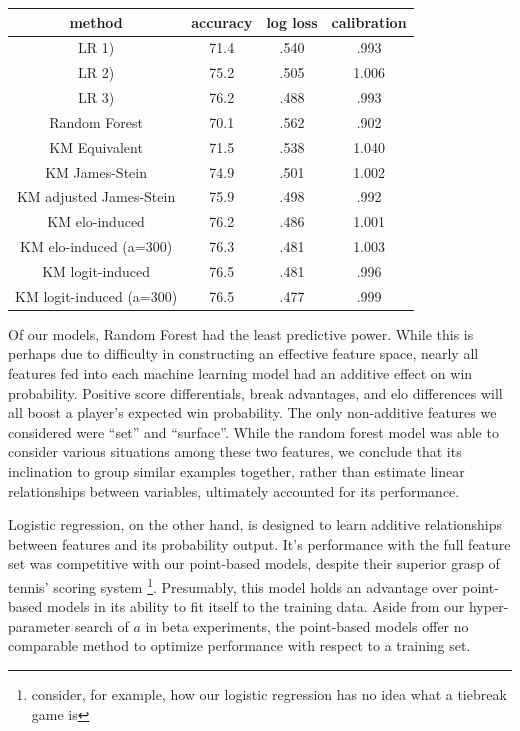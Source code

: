 \documentclass[chapterprefix=false]{report}
\begin{document}
\begin{center}
\begin{tabular}{ |c|c|c|c| } 
 \hline
 method & accuracy & log loss & calibration
   \\ 
 \hline
  LR 1) & 71.4 & .540 & .993
  \\ 
 \hline
  LR 2) & 75.2 & .505 & 1.006
  \\ 
 \hline
 LR 3) & 76.2 & .488 & .993
  \\ 
 \hline
 Random Forest & 70.1 & .562 & .902
  \\ 
 \hline
 KM Equivalent & 71.5 & .538 & 1.040
  \\ 
 \hline
 KM James-Stein & 74.9 & .501 & 1.002
  \\ 
 \hline
 KM adjusted James-Stein & 75.9 & .498 & .992
  \\ 
 \hline
 KM elo-induced & 76.2 & .486 & 1.001
  \\ 
 \hline
  KM elo-induced (a=300) & 76.3  & .481 & 1.003
  \\ 
 \hline
  KM logit-induced & 76.5 & .481 & .996
  \\ 
 \hline
 KM logit-induced (a=300) & 76.5 & .477 & .999
  \\ 
 \hline
\end{tabular}
\end{center}

Of our models, Random Forest had the least predictive power. While this is perhaps due to difficulty in constructing an effective feature space, nearly all features fed into each machine learning model had an additive effect on win probability. Positive score differentials, break advantages, and elo differences will all boost a player's expected win probability. The only non-additive features we considered were ``set'' and ``surface''. While the random forest model was able to consider various situations among these two features, we conclude that its inclination to group similar examples together, rather than estimate linear relationships between variables, ultimately accounted for its performance.

Logistic regression, on the other hand, is designed to  learn additive relationships between features and its probability output. It's performance with the full feature set was competitive with our point-based models, despite their superior grasp of tennis' scoring system \footnote{consider, for example, how our logistic regression has no idea what a tiebreak game is}. Presumably, this model holds an advantage over point-based models in its ability to fit itself to the training data. Aside from our hyper-parameter search of $a$ in beta experiments, the point-based models offer no comparable method to optimize performance with respect to a training set.
\end{document}
